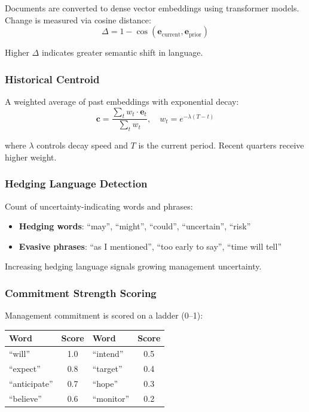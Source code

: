 Documents are converted to dense vector embeddings using transformer models. Change is measured via cosine distance:
\[
\Delta = 1 - \cos(\mathbf{e}_{\text{current}}, \mathbf{e}_{\text{prior}})
\]

Higher $\Delta$ indicates greater semantic shift in language.

\subsubsection{Historical Centroid}

A weighted average of past embeddings with exponential decay:
\[
\mathbf{c} = \frac{\sum_{t} w_t \cdot \mathbf{e}_t}{\sum_{t} w_t}, \quad w_t = e^{-\lambda (T - t)}
\]

where $\lambda$ controls decay speed and $T$ is the current period. Recent quarters receive higher weight.

\subsubsection{Hedging Language Detection}

Count of uncertainty-indicating words and phrases:
\begin{itemize}
  \item \textbf{Hedging words}: ``may'', ``might'', ``could'', ``uncertain'', ``risk''
  \item \textbf{Evasive phrases}: ``as I mentioned'', ``too early to say'', ``time will tell''
\end{itemize}

Increasing hedging language signals growing management uncertainty.

\subsubsection{Commitment Strength Scoring}

Management commitment is scored on a ladder (0--1):

\begin{center}
\begin{tabular}{lclc}
\textbf{Word} & \textbf{Score} & \textbf{Word} & \textbf{Score} \\
\hline
``will'' & 1.0 & ``intend'' & 0.5 \\
``expect'' & 0.8 & ``target'' & 0.4 \\
``anticipate'' & 0.7 & ``hope'' & 0.3 \\
``believe'' & 0.6 & ``monitor'' & 0.2 \\
\end{tabular}
\end{center}

